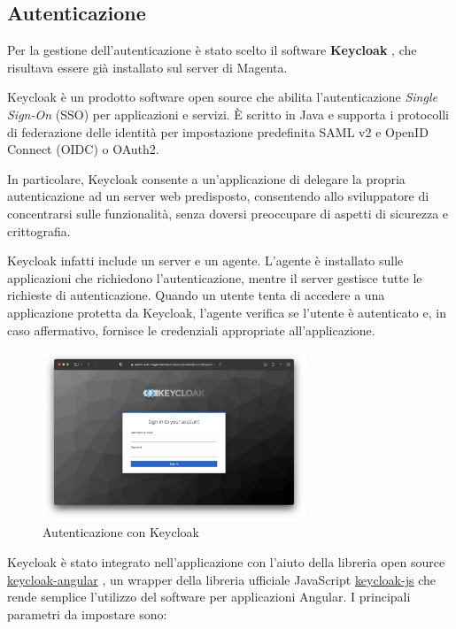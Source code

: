 \subsection{Autenticazione}\label{sec:autenticazione}
Per la gestione dell'autenticazione è stato scelto il software \textbf{Keycloak} \cite{keycloak}, che risultava essere già installato sul server di Magenta.

Keycloak è un prodotto software open source che abilita l'autenticazione \textit{Single Sign-On} (SSO) per applicazioni e servizi. È scritto in Java e supporta i protocolli di federazione delle identità per impostazione predefinita SAML v2 e OpenID Connect (OIDC) o OAuth2. \cite{keycloak}

In particolare, Keycloak consente a un'applicazione di delegare la propria autenticazione ad un server web predisposto, consentendo allo sviluppatore di concentrarsi sulle funzionalità, senza doversi preoccupare di aspetti di sicurezza e crittografia.

Keycloak infatti include un server e un agente. L'agente è installato sulle applicazioni che richiedono l'autenticazione, mentre il server gestisce tutte le richieste di autenticazione. Quando un utente tenta di accedere a una applicazione protetta da Keycloak, l'agente verifica se l'utente è autenticato e, in caso affermativo, fornisce le credenziali appropriate all'applicazione.

\begin{figure}[H]
\centering
\includegraphics[width=0.70\textwidth,height=\textheight,keepaspectratio]{img/keycloak}
\caption{Autenticazione con Keycloak}
\label{fig:keycloak}
\end{figure}

Keycloak è stato integrato nell'applicazione con l'aiuto della libreria open source \url{keycloak-angular} \cite{keycloak-angular}, un wrapper della libreria ufficiale JavaScript \url{keycloak-js} \cite{keycloak-js} che rende semplice l'utilizzo del software per applicazioni Angular. I principali parametri da impostare sono:

